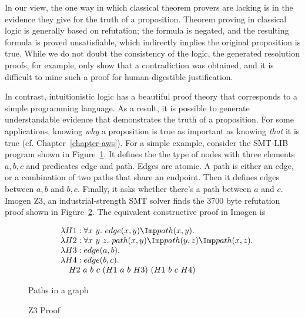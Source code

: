 In our view, the one way in which classical theorem provers are lacking is in
the evidence they give for the truth of a proposition.  Theorem proving in
classical logic is generally based on refutation; the formula is negated, and
the resulting formula is proved unsatisfiable, which indirectly implies the
original proposition is true.  While we do not doubt the consistency of
the logic, the generated resolution proofs, for example, only show that a
contradiction was obtained, and it is difficult to mine such a proof for
human-digestible justification.

In contrast, intuitionistic logic has a beautiful proof theory that corresponds
to a simple programming language.  As a result, it is possible to generate
understandable evidence that demonstrates the truth of a proposition.  For some
applications, knowing \emph{why} a proposition is true as important as knowing
\emph{that} it is true (cf. Chapter~\ref{chapter-aws}).  For a simple example,
consider the SMT-LIB program shown in Figure~\ref{figure.z3-path}.  It defines
the the type of nodes with three elements $a, b, c$ and predicates \textsf{edge}
and \textsf{path}.  Edges are atomic.  A path is either an edge, or a
combination of two paths that share an endpoint.  Then it defines edges between
$a, b$ and $b, c$.  Finally, it asks whether there's a path between $a$ and $c$.
Imogen Z3, an industrial-strength SMT solver finds the 3700 byte refutation
proof shown in Figure~\ref{figure.z3-proof}.  The equivalent constructive proof
in Imogen is

\[
\begin{array}{rl}
  &\lambda H1: \forall x\ y.\ edge(x, y) \Imp path(x, y). \\
  &\lambda H2: \forall x\ y\ z.\ path(x, y) \Imp path(y, z) \Imp path(x, z).\\
  &\lambda H3: edge(a, b). \\
  &\lambda H4: edge(b, c). \\
  &\hspace{1em}  H2\ a\ b\ c\ (H1\ a\ b\ H3)\ (H1\ b\ c\ H4)
\end{array}
\]

\begin{figure}
  \caption{Paths in a graph}
  \label{figure.z3-path}
\end{figure}

\begin{figure}
\caption{Z3 Proof}
\label{figure.z3-proof}
\end{figure}

